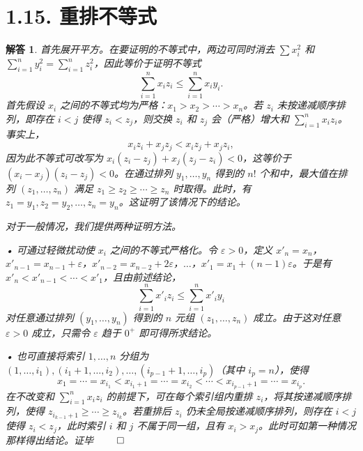 \documentclass[12pt,UTF8]{ctexbook}
\theoremstyle{exercisestyle}
\theoremstyle{solutionstyle}
\newtheorem*{solution*}{解答}
\newenvironment{solution}
  {\begin{solution*}}
  {\hfill\ensuremath{\qed}\end{solution*}}
\begin{document}
\section{1.15. 重排不等式}
\begin{solution}
首先展开平方。在要证明的不等式中，两边可同时消去 \(\sum x_i^2\) 和 \(\sum_{i=1}^{n} y_i^2 = \sum_{i=1}^{n} z_i^2\)，因此等价于证明不等式
\[
\sum_{i=1}^{n} x_i z_i \leqslant \sum_{i=1}^{n} x_i y_i.
\]
首先假设 \(x_i\) 之间的不等式均为严格：\(x_1 > x_2 > \cdots > x_n\)。若 \(z_i\) 未按递减顺序排列，即存在 \(i < j\) 使得 \(z_i < z_j\)，则交换 \(z_i\) 和 \(z_j\) 会（严格）增大和 \(\sum_{i=1}^{n} x_i z_i\)。事实上，
\[
x_i z_i + x_j z_j < x_i z_j + x_j z_i,
\]
因为此不等式可改写为 \(x_i(z_i - z_j) + x_j(z_j - z_i) < 0\)，这等价于 \((x_i - x_j)(z_i - z_j) < 0\)。在通过排列 \(y_1, \ldots, y_n\) 得到的 \(n!\) 个和中，最大值在排列 \((z_1, \ldots, z_n)\) 满足 \(z_1 \geqslant z_2 \geqslant \cdots \geqslant z_n\) 时取得。此时，有 \(z_1 = y_1, z_2 = y_2, \ldots, z_n = y_n\)。这证明了该情况下的结论。

对于一般情况，我们提供两种证明方法。

• 可通过轻微扰动使 \(x_i\) 之间的不等式严格化。令 \(\varepsilon > 0\)，定义 \(x'_n = x_n\)，\(x'_{n-1} = x_{n-1} + \varepsilon\)，\(x'_{n-2} = x_{n-2} + 2\varepsilon\)，\(\ldots\)，\(x'_1 = x_1 + (n-1)\varepsilon\)。于是有 \(x'_n < x'_{n-1} < \cdots < x'_1\)，且由前述结论，
\[
\sum_{i=1}^{n} x'_i z_i \leqslant \sum_{i=1}^{n} x'_i y_i
\]
对任意通过排列 \((y_1, \ldots, y_n)\) 得到的 \(n\) 元组 \((z_1, \ldots, z_n)\) 成立。由于这对任意 \(\varepsilon > 0\) 成立，只需令 \(\varepsilon\) 趋于 \(0^+\) 即可得所求结论。

• 也可直接将索引 \(1, \ldots, n\) 分组为 \((1, \ldots, i_1), (i_1 + 1, \ldots, i_2), \ldots, (i_{p-1} + 1, \ldots, i_p)\)（其中 \(i_p = n\)），使得
\[
x_1 = \cdots = x_{i_1} < x_{i_1+1} = \cdots = x_{i_2} < \cdots < x_{i_{p-1}+1} = \cdots = x_{i_p}.
\]
在不改变和 \(\sum_{i=1}^{n} x_i z_i\) 的前提下，可在每个索引组内重排 \(z_i\)，将其按递减顺序排列，使得 \(z_{i_{k-1}+1} \geqslant \cdots \geqslant z_{i_k}\)。若重排后 \(z_i\) 仍未全局按递减顺序排列，则存在 \(i < j\) 使得 \(z_i < z_j\)，此时索引 \(i\) 和 \(j\) 不属于同一组，且有 \(x_i > x_j\)。此时可如第一种情况那样得出结论。证毕
\end{solution}
\end{document}

